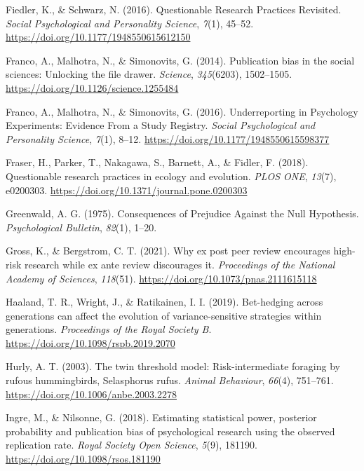 \documentclass[
  ,man,mask,floatsintext]{apa6}
\newlength{\cslhangindent}
\newlength{\cslentryspacingunit} %
\newenvironment{CSLReferences}[2] %
 {%
  \setlength{\parindent}{0pt}
  \ifodd #1
  \let\oldpar\par
  \def\par{\hangindent=\cslhangindent\oldpar}
  \fi
  \setlength{\parskip}{#2\cslentryspacingunit}
 }%
 {}
\begin{document}
\begin{CSLReferences}{1}{0}
\leavevmode{}%
Fiedler, K., \& Schwarz, N. (2016). Questionable {Research Practices Revisited}. \emph{Social Psychological and Personality Science}, \emph{7}(1), 45--52. \url{https://doi.org/10.1177/1948550615612150}

\leavevmode{}%
Franco, A., Malhotra, N., \& Simonovits, G. (2014). Publication bias in the social sciences: {Unlocking} the file drawer. \emph{Science}, \emph{345}(6203), 1502--1505. \url{https://doi.org/10.1126/science.1255484}

\leavevmode{}%
Franco, A., Malhotra, N., \& Simonovits, G. (2016). Underreporting in {Psychology Experiments}: {Evidence From} a {Study Registry}. \emph{Social Psychological and Personality Science}, \emph{7}(1), 8--12. \url{https://doi.org/10.1177/1948550615598377}

\leavevmode{}%
Fraser, H., Parker, T., Nakagawa, S., Barnett, A., \& Fidler, F. (2018). Questionable research practices in ecology and evolution. \emph{PLOS ONE}, \emph{13}(7), e0200303. \url{https://doi.org/10.1371/journal.pone.0200303}

\leavevmode{}%
Greenwald, A. G. (1975). Consequences of {Prejudice Against} the {Null Hypothesis}. \emph{Psychological Bulletin}, \emph{82}(1), 1--20.

\leavevmode{}%
Gross, K., \& Bergstrom, C. T. (2021). Why ex post peer review encourages high-risk research while ex ante review discourages it. \emph{Proceedings of the National Academy of Sciences}, \emph{118}(51). \url{https://doi.org/10.1073/pnas.2111615118}

\leavevmode{}%
Haaland, T. R., Wright, J., \& Ratikainen, I. I. (2019). Bet-hedging across generations can affect the evolution of variance-sensitive strategies within generations. \emph{Proceedings of the Royal Society B}. \url{https://doi.org/10.1098/rspb.2019.2070}

\leavevmode{}%
Hurly, A. T. (2003). The twin threshold model: Risk-intermediate foraging by rufous hummingbirds, {Selasphorus} rufus. \emph{Animal Behaviour}, \emph{66}(4), 751--761. \url{https://doi.org/10.1006/anbe.2003.2278}

\leavevmode{}%
Ingre, M., \& Nilsonne, G. (2018). Estimating statistical power, posterior probability and publication bias of psychological research using the observed replication rate. \emph{Royal Society Open Science}, \emph{5}(9), 181190. \url{https://doi.org/10.1098/rsos.181190}


\end{CSLReferences}
\end{document}
